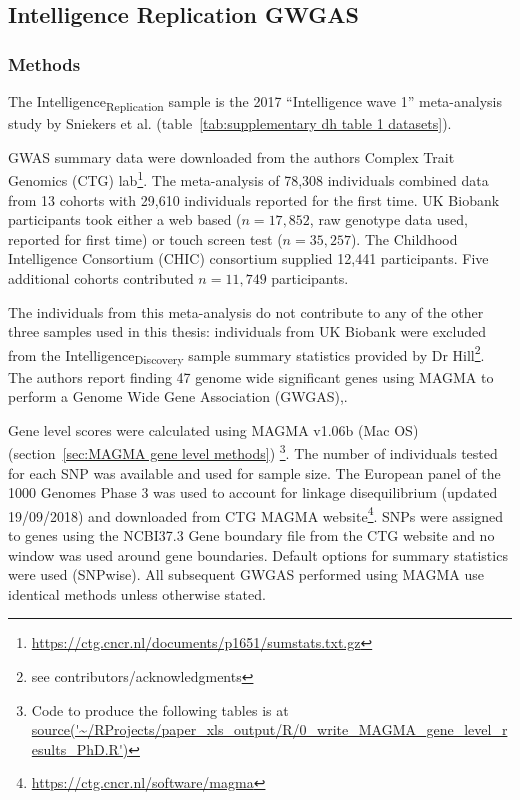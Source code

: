 \subsection{Intelligence Replication GWGAS}
\label{sec:Intelligence Replication GWGAS}

\subsubsection{Methods}
The Intelligence\textsubscript{Replication} sample is the 2017 ``Intelligence wave 1'' meta-analysis study by Sniekers et al.\cite{sniekers2017genome} (table~\ref{tab:supplementary dh table 1 datasets}). 

GWAS summary data were downloaded from the authors Complex Trait Genomics (CTG) lab\footnote{ \url{https://ctg.cncr.nl/documents/p1651/sumstats.txt.gz}}. The meta-analysis of 78,308 individuals combined data from 13 cohorts with 29,610 individuals reported for the first time. UK Biobank participants took either a web based ($n=17,852$, raw genotype data used, reported for first time) or touch screen test ($n=35,257$). The Childhood Intelligence Consortium (CHIC) consortium supplied 12,441 participants\cite{benyamin2014childhood}. Five additional cohorts contributed $n=11,749$ participants.

The individuals from this meta-analysis do not contribute to any of the other three samples used in this thesis: individuals from UK Biobank were excluded from the Intelligence\textsubscript{Discovery} sample summary statistics provided by Dr Hill\footnote{see contributors/acknowledgments}. The authors report finding 47 genome wide significant genes using MAGMA to perform a Genome Wide Gene Association (GWGAS)\cite{sniekers2017genome},\cite{de2015magma}.

Gene level scores were calculated using MAGMA v1.06b (Mac OS)(section~\ref{sec:MAGMA gene level methods}) \footnote{Code to produce the following tables is at \url{source('~/RProjects/paper_xls_output/R/0_write_MAGMA_gene_level_results_PhD.R')} }. The number of individuals tested for each SNP was available and used for sample size. The European panel of the 1000 Genomes Phase 3 was used to account for linkage disequilibrium
 (updated 19/09/2018) and downloaded from CTG MAGMA website\footnote{\url{https://ctg.cncr.nl/software/magma}}. SNPs were assigned to genes using the NCBI37.3 Gene boundary file from the CTG website and no window was used around gene boundaries. Default options for summary statistics were used (SNPwise). All subsequent GWGAS performed using MAGMA use identical methods unless otherwise stated. 


